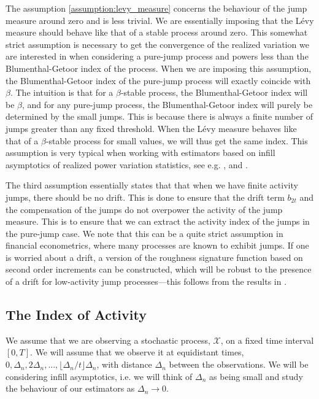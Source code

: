 \documentclass[fleqn,11pt,letterpaper]{article}
\theoremstyle{plain}
\theoremstyle{definition}
\theoremstyle{remark}
\numberwithin{equation}{section}
\begin{document}
The assumption \ref{assumption:levy_measure} concerns the behaviour of the jump measure around zero and is less trivial. We are essentially imposing that the Lévy measure should behave like that of a stable process around zero. This somewhat strict assumption is necessary to get the convergence of the realized variation we are interested in when considering a pure-jump process and powers less than the Blumenthal-Getoor index of the process. When we are imposing this assumption, the Blumenthal-Getoor index of the pure-jump process will exactly coincide with $\beta$. The intuition is that for a $\beta$-stable process, the Blumenthal-Getoor index will be $\beta$, and for any pure-jump process, the Blumenthal-Getoor index will purely be determined by the small jumps. This is because there is always a finite number of jumps greater than any fixed threshold. When the Lévy measure behaves like that of a $\beta$-stable process for small values, we will thus get the same index. This assumption is very typical when working with estimators based on infill asymptotics of realized power variation statistics, see e.g. \cite{Todorov2010}, \cite{Ait-Sahalia2009a} and \cite{Woener2011}.

The third assumption essentially states that that when we have finite activity jumps, there should be no drift. This is done to ensure that the drift term $b_{2t}$ and the compensation of the jumps do not overpower the activity of the jump measure. This is to ensure that we can extract the activity index of the jumps in the pure-jump case. We note that this can be a quite strict assumption in financial econometrics, where many processes are known to exhibit jumps. If one is worried about a drift, a version of the roughness signature function based on second order increments can be constructed, which will be robust to the presence of a drift for low-activity jump processes---this follows from the results in \cite{Todorov2013}. 

\subsection{The Index of Activity}

We assume that we are observing a stochastic process, $\mathcal{X}$, on a fixed time interval $[0,T]$. We will assume that we observe it at equidistant times, $0,\Delta_n,2\Delta_n,...,\lfloor\Delta_n/t\rfloor\Delta_n$, with distance $\Delta_n$ between the observations. We will be considering infill asymptotics, i.e. we will think of $\Delta_n$ as being small and study the behaviour of our estimators as $\Delta_n\to0$. 
\end{document}
